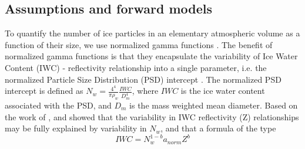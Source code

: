 \documentclass{ametsocV6.1}
\begin{document}
\subsection{Assumptions and forward models}
To quantify the number of ice particles in an elementary atmospheric volume as a function of their size, we use normalized gamma functions \citep{bringi2003}.  The benefit of normalized gamma functions is that they encapsulate the variability of Ice Water Content (IWC) - reflectivity relationship into a single parameter, i.e. the normalized Particle Size Distribution (PSD) intercept \citep{testud2001,bringi2003}. The normalized PSD intercept is defined as $N_w=\frac {4^4} {\pi \rho_w} \frac {IWC} {D_m^4}$, where $IWC$ is the ice water content associated with the PSD, and $D_m$ is the mass weighted mean diameter.  Based on the work of \cite{testud2001}, \cite{ferreira2001} and \cite{delanoe2014} showed that the variability in IWC reflectivity (Z) relationships may be fully explained by variability in $N_w$, and that a formula of the type
\begin{equation}
IWC=N_w^{1-b}a_{norm} Z^b \label{eq:1}
\end{equation}
\end{document}
